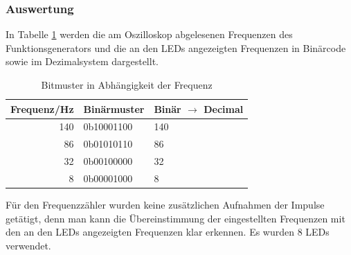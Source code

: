 \documentclass[12pt,a4paper]{article}
\begin{document}
\subsubsection*{Auswertung}
In Tabelle \ref{tab:frequ} werden die am Oszilloskop abgelesenen Frequenzen des Funktionsgenerators und die an den LEDs angezeigten Frequenzen in Binärcode sowie im Dezimalsystem dargestellt.
\begin{table}[htbp]
\begin{center}
\begin{tabular}{|r|l|l|}
	\hline
	\multicolumn{1}{|l|}{Frequenz/Hz} & Binärmuster & Binär $\rightarrow$ Decimal \\ \hline\hline
	                              140 & 0b10001100  & 140                         \\ \hline
	                               86 & 0b01010110  & 86                          \\ \hline
	                               32 & 0b00100000  & 32                          \\ \hline
	                                8 & 0b00001000  & 8                           \\ \hline
\end{tabular}
\end{center}
\caption{Bitmuster in Abhängigkeit der Frequenz}
\label{tab:frequ}
\end{table}
Für den Frequenzzähler wurden keine zusätzlichen Aufnahmen der Impulse getätigt, denn man kann die Übereinstimmung der eingestellten Frequenzen mit den an den LEDs angezeigten Frequenzen klar erkennen. Es wurden 8 LEDs verwendet.
\end{document}
